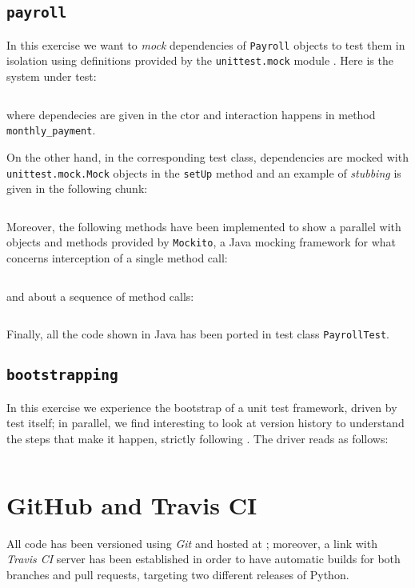 \documentclass[12pt]{article}
\begin{document}
\subsection{\texttt{payroll}}

In this exercise we want to \emph{mock} dependencies of
\texttt{Payroll} objects to test them in isolation using
definitions provided by the \texttt{unittest.mock} module \cite{unittest.mock}.
Here is the system under test: \inputminted[firstline=1,
lastline=19]{python}{../payroll/payroll.py} 
\noindent where dependecies are given in the
ctor and interaction happens in method \texttt{monthly_payment}.

On the other hand, in the corresponding test class, dependencies are mocked
with \texttt{unittest.mock.Mock} objects in the \texttt{setUp} method and an
example of \emph{stubbing} is given in the following chunk:
\inputminted[firstline=20, lastline=30]{python}{../payroll/payroll_test.py}
Moreover, the following methods have been implemented to show a parallel with
objects and methods provided by \texttt{Mockito}, a Java mocking framework for
what concerns interception of a single method call: \inputminted[firstline=42,
lastline=51]{python}{../payroll/payroll_test.py} and about a sequence of method
calls: \inputminted[firstline=63,
lastline=73]{python}{../payroll/payroll_test.py} Finally, all the code shown in
Java has been ported in test class \texttt{PayrollTest}.

\subsection{\texttt{bootstrapping}}
In this exercise we experience the bootstrap of a unit test framework, 
driven by test itself; in parallel, we find interesting to look at version
history to understand the steps that make it happen, strictly following
\cite{beck}. The driver reads as follows:
\inputminted{python}{../tdd/tdd_test.py}

\section{GitHub and Travis CI}

All code has been versioned using \emph{Git} and hosted at \cite{repo}; moreover,
a link with \emph{Travis CI} server \cite{travis} has been established in order to have
automatic builds for both branches and pull requests, targeting two 
different releases of Python.
\end{document}
